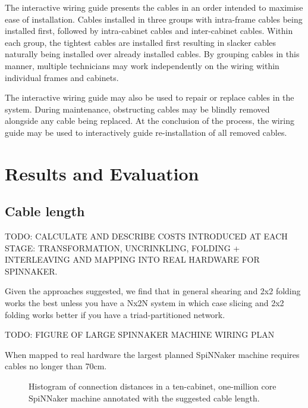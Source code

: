 			The interactive wiring guide presents the cables in an order intended to
			maximise ease of installation. Cables installed in three groups with
			intra-frame cables being installed first, followed by intra-cabinet
			cables and inter-cabinet cables. Within each group, the tightest cables
			are installed first resulting in slacker cables naturally being installed
			over already installed cables. By grouping cables in this manner,
			multiple technicians may work independently on the wiring within
			individual frames and cabinets.
			
			The interactive wiring guide may also be used to repair or replace cables
			in the system. During maintenance, obstructing cables may be blindly
			removed alongside any cable being replaced. At the conclusion of the
			process, the wiring guide may be used to interactively guide
			re-installation of all removed cables.
	
	\section{Results and Evaluation}
		
		\subsection{Cable length}
			
			TODO: CALCULATE AND DESCRIBE COSTS INTRODUCED AT EACH STAGE:
			TRANSFORMATION, UNCRINKLING, FOLDING + INTERLEAVING AND MAPPING INTO REAL
			HARDWARE FOR SPINNAKER.
			
			Given the approaches suggested, we find that in general shearing and 2x2
			folding works the best unless you have a Nx2N system in which case
			slicing and 2x2 folding works better if you have a triad-partitioned
			network.
			
			TODO: FIGURE OF LARGE SPINNAKER MACHINE WIRING PLAN
			
			When mapped to real hardware the largest planned SpiNNaker machine
			requires cables no longer than 70cm.
			
			\begin{figure}
				
				\center
				
				
				\caption{Histogram of connection distances in a ten-cabinet,
				one-million core SpiNNaker machine annotated with the suggested cable
				length.}
				\label{fig:wire-length-histogram}
				
			\end{figure}
			

